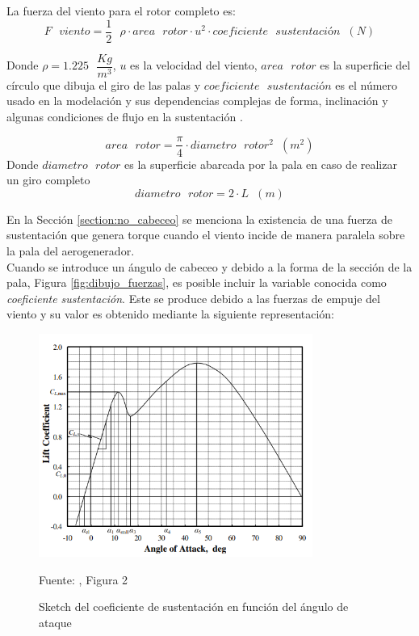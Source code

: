  
La fuerza del viento para el rotor completo es:
 \begin{equation}
  F \text{ } viento = \dfrac{1}{2} \text{ } \rho \cdot area \text{ } rotor \cdot u^2 \cdot coeficiente \text{ } sustentación \hspace{7pt} (N)
   \end{equation}
   
    Donde $\rho = 1.225 \text{ } \dfrac{Kg}{m^3}$, $u$ es la velocidad del viento, $area \text{ } rotor$ es la superficie del círculo que dibuja el giro de las palas y $coeficiente \text{ } sustentación$ es el número usado en la modelación y sus dependencias complejas de forma, inclinación y algunas condiciones de flujo en la sustentación \cite{Hall2021}.
    
  \begin{equation}
  area \text{ } rotor = \dfrac{\pi}{4} \cdot diametro \text{ } rotor^2 \hspace{7pt} (m^2) 
  \end{equation}
  Donde $diametro \text{ } rotor $ es la superficie abarcada por la pala en caso de realizar un giro completo
  \begin{equation}
  diametro \text{ } rotor = 2 \cdot L \hspace{7pt} (m)
 \end{equation}

 En la Sección \ref{section:no_cabeceo} se menciona la existencia de una fuerza de sustentación que genera torque cuando el viento incide de manera paralela sobre la pala del aerogenerador.\\
 
 Cuando se introduce un ángulo de cabeceo y debido a la forma de la sección de la pala, Figura \ref{fig:dibujo_fuerzas}, es posible incluir la variable conocida como \textit{coeficiente sustentación}. Este se produce debido a las fuerzas de empuje del viento y su valor es obtenido mediante la siguiente representación:
 
 \begin{figure}[H]
    \centering
    \includegraphics[width=0.8\textwidth]{images/imagen del coeficiente sustentacion.PNG}
    \caption{Sketch del coeficiente de sustentación en función del ángulo de ataque}
    Fuente: \cite{johann2016}, Figura 2
    \label{fig:plot_coef_sustentacion}
\end{figure}

